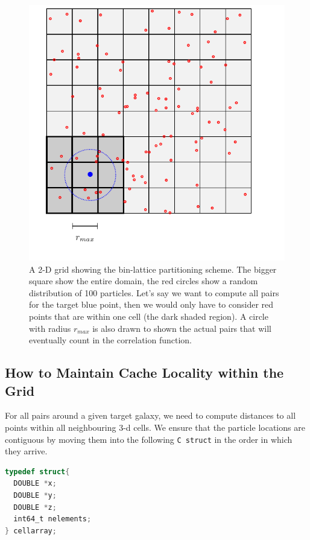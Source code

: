 \documentclass[12pt,titlepage]{article}
\newcommand{\rmax}{\ensuremath{{r_{max}}}\xspace}
\begin{document}
\begin{figure}
\centering
\includegraphics[width=\textwidth,clip=true]{tikz_grid}
\caption{A 2-D grid showing the bin-lattice partitioning scheme. The bigger square show the entire
domain, the red circles show a random distribution of 100 particles. Let's say we want to compute all pairs
for the target blue point, then we would only have to consider red points that are within one cell (the dark shaded region).
A circle with radius \rmax is also drawn to shown the actual pairs that will eventually count in the correlation function.}
\label{fig:grid}
\end{figure}


\subsection{How to Maintain Cache Locality within the Grid}
For all pairs around a given target galaxy, we need to compute distances to all points within all neighbouring 3-d cells.
We ensure that the particle locations are contiguous by moving them into the following \texttt{C struct} in the order in which they arrive.

\begin{lstlisting}[language=C,numbers=none,label={code:celldefn},caption={Definition of the cellarray structure. This 
structure contains the \texttt{X/Y/Z} positions of all the particles that are in one 3-D cell. }]
typedef struct{
  DOUBLE *x;
  DOUBLE *y;
  DOUBLE *z;
  int64_t nelements;
} cellarray;
\end{lstlisting}
\end{document}

